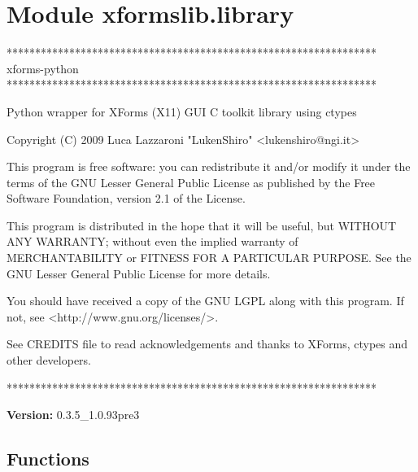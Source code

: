 %
%
%


\section{Module xformslib.library}

    \label{xformslib:library}
***************************************************************** 
xforms-python 
*****************************************************************

Python wrapper for XForms (X11) GUI C toolkit library using ctypes

Copyright (C) 2009  Luca Lazzaroni "LukenShiro"  
{\textless}lukenshiro@ngi.it{\textgreater}

This program is free software: you can redistribute it and/or modify it 
under the terms of the GNU Lesser General Public License as published by 
the Free Software Foundation, version 2.1 of the License.

This program is distributed in the hope that it will be useful, but WITHOUT
ANY WARRANTY; without even the implied warranty of MERCHANTABILITY or 
FITNESS FOR A PARTICULAR PURPOSE. See the GNU Lesser General Public License
for more details.

You should have received a copy of the GNU LGPL along with this program. If
not, see {\textless}http://www.gnu.org/licenses/{\textgreater}.

See CREDITS file to read acknowledgements and thanks to XForms, ctypes and 
other developers.

*****************************************************************

\textbf{Version:} 0.3.5\_1.0.93pre3





  \subsection{Functions}

